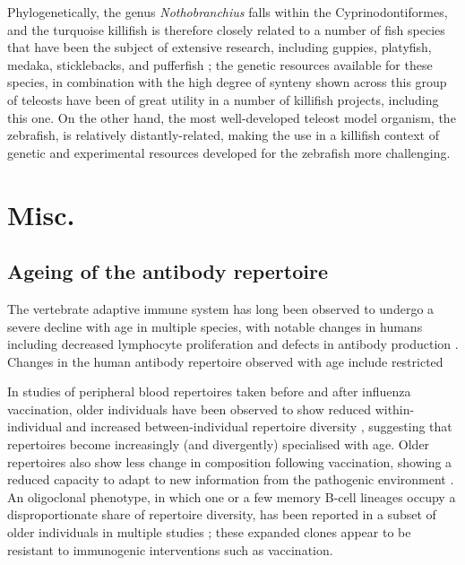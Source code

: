 
Phylogenetically, the genus \textit{Nothobranchius} falls within the Cyprinodontiformes, and the turquoise killifish is therefore closely related to a number of fish species that have been the subject of extensive research, including guppies, platyfish, medaka, sticklebacks, and pufferfish  \citep{terzibasi2007review} %
; the genetic resources available for these species, in combination with the high degree of synteny shown across this group of teleosts \citep{terzibasi2007review} have been of great utility in a number of killifish projects, including this one. On the other hand, the most well-developed teleost model organism, the zebrafish, is relatively distantly-related, making the use in a killifish context of genetic and experimental resources developed for the zebrafish more challenging.



\section{Misc.}

\subsection{Ageing of the antibody repertoire}


The vertebrate adaptive immune system has long been observed to undergo a severe decline with age in multiple species, with notable changes in humans including decreased lymphocyte proliferation \citep{debourcy2017ageing} and defects in antibody production \citep{debourcy2017ageing}. Changes in the human antibody repertoire observed with age include restricted

In studies of peripheral blood repertoires taken before and after influenza vaccination, older individuals have been observed to show reduced within-individual and increased between-individual repertoire diversity \citep{debourcy2017ageing}, suggesting that repertoires become increasingly (and divergently) specialised with age. Older repertoires also show less change in composition following vaccination, showing a reduced capacity to adapt to new information from the pathogenic environment \citep{debourcy2017ageing}. An oligoclonal phenotype, in which one or a few memory B-cell lineages occupy a disproportionate share of repertoire diversity, has been reported in a subset of older individuals in multiple studies \citep{debourcy2017ageing}; these expanded clones appear to be resistant to immunogenic interventions such as vaccination. 

